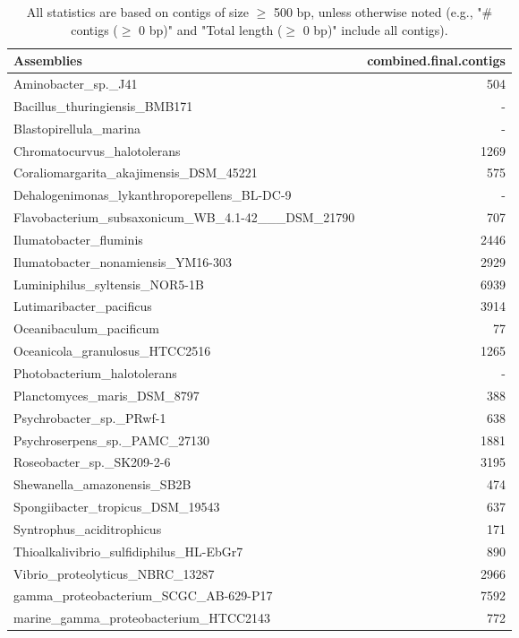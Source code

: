 \documentclass[12pt,a4paper]{article}
\begin{document}
\begin{table}[ht]
\begin{center}
\caption{All statistics are based on contigs of size $\geq$ 500 bp, unless otherwise noted (e.g., "\# contigs ($\geq$ 0 bp)" and "Total length ($\geq$ 0 bp)" include all contigs).}
\begin{tabular}{|l*{1}{|r}|}
\hline
Assemblies & combined.final.contigs \\ \hline
Aminobacter\_sp.\_J41 & 504 \\ \hline
Bacillus\_thuringiensis\_BMB171 & - \\ \hline
Blastopirellula\_marina & - \\ \hline
Chromatocurvus\_halotolerans & 1269 \\ \hline
Coraliomargarita\_akajimensis\_DSM\_45221 & 575 \\ \hline
Dehalogenimonas\_lykanthroporepellens\_BL-DC-9 & - \\ \hline
Flavobacterium\_subsaxonicum\_WB\_4.1-42\_\_\_DSM\_21790 & 707 \\ \hline
Ilumatobacter\_fluminis & 2446 \\ \hline
Ilumatobacter\_nonamiensis\_YM16-303 & 2929 \\ \hline
Luminiphilus\_syltensis\_NOR5-1B & 6939 \\ \hline
Lutimaribacter\_pacificus & 3914 \\ \hline
Oceanibaculum\_pacificum & 77 \\ \hline
Oceanicola\_granulosus\_HTCC2516 & 1265 \\ \hline
Photobacterium\_halotolerans & - \\ \hline
Planctomyces\_maris\_DSM\_8797 & 388 \\ \hline
Psychrobacter\_sp.\_PRwf-1 & 638 \\ \hline
Psychroserpens\_sp.\_PAMC\_27130 & 1881 \\ \hline
Roseobacter\_sp.\_SK209-2-6 & 3195 \\ \hline
Shewanella\_amazonensis\_SB2B & 474 \\ \hline
Spongiibacter\_tropicus\_DSM\_19543 & 637 \\ \hline
Syntrophus\_aciditrophicus & 171 \\ \hline
Thioalkalivibrio\_sulfidiphilus\_HL-EbGr7 & 890 \\ \hline
Vibrio\_proteolyticus\_NBRC\_13287 & 2966 \\ \hline
gamma\_proteobacterium\_SCGC\_AB-629-P17 & 7592 \\ \hline
marine\_gamma\_proteobacterium\_HTCC2143 & 772 \\ \hline
\end{tabular}
\end{center}
\end{table}
\end{document}
